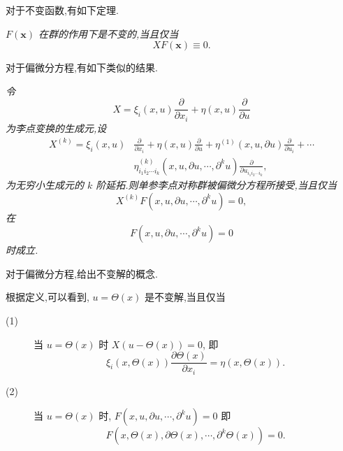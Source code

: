 对于不变函数,有如下定理.
\begin{theorem}
	\emph{$F(\mathbf{x})$ 在群的作用下是不变的,当且仅当
	\begin{equation*}
		XF(\mathbf{x})\equiv 0.
	\end{equation*}}
\end{theorem}

对于偏微分方程,有如下类似的结果.
\begin{theorem}[偏微分方程不变形的无穷小准则]
	\emph{令
	\begin{equation*}
		X=\xi_i(x,u)\frac{\partial}{\partial x_i}+\eta(x,u)\frac{\partial}{\partial u}
	\end{equation*}
	为李点变换的生成元,设
	\begin{equation*}
\begin{aligned}
X^{(k)}=\xi_i(x,u)&\frac{\partial}{\partial x_i}+\eta(x,u)\frac{\partial}{\partial u}+\eta^{(1)}(x,u,\partial u)\frac{\partial}{\partial u_i}+\cdots \\
&\eta^{(k)}_{i_1i_2\cdots i_k}(x,u,\partial u,\cdots,\partial ^k u)\frac{\partial}{\partial u_{i_1i_2\cdots i_k}},
\end{aligned}
\end{equation*}
为无穷小生成元的 $k$ 阶延拓.则单参李点对称群被偏微分方程所接受,当且仅当
\begin{equation*}
	X^{(k)}F(x,u,\partial u,\cdots,\partial ^k u)=0,
\end{equation*}
在
\begin{equation*}
	F(x,u,\partial u,\cdots,\partial ^k u)=0
\end{equation*}
时成立.}
\end{theorem}

对于偏微分方程,给出不变解的概念.

根据定义,可以看到, $u=\Theta(x)$ 是不变解,当且仅当
\begin{description}
	\item[(1)] 当 $u=\Theta(x)$ 时 $X(u-\Theta(x))=0$, 即
	\begin{equation*}
		\xi_i(x,\Theta(x))\frac{\partial \Theta(x)}{\partial x_i}=\eta(x,\Theta(x)).
	\end{equation*}
	\item[(2)] 当 $u=\Theta(x)$ 时, $F(x,u,\partial u,\cdots,\partial ^k u)=0$ 即
	\begin{equation*}
		F(x,\Theta(x),\partial \Theta(x),\cdots,\partial ^k \Theta(x))=0.
	\end{equation*}
\end{description}

